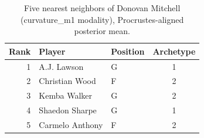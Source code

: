 \begin{table}[htbp]
  \centering\small
  \begin{tabular}{rllc}
    \toprule
    Rank & Player & Position & Archetype \\
    \midrule
    1 & A.J. Lawson & G & 1 \\
    2 & Christian Wood & F & 2 \\
    3 & Kemba Walker & G & 2 \\
    4 & Shaedon Sharpe & G & 1 \\
    5 & Carmelo Anthony & F & 2 \\
    \bottomrule
  \end{tabular}
  \caption{Five nearest neighbors of Donovan Mitchell (curvature_m1 modality), Procrustes-aligned posterior mean.}
  \label{tab:Donovan_Mitchell_neighbors_curvature_m1}
\end{table}

